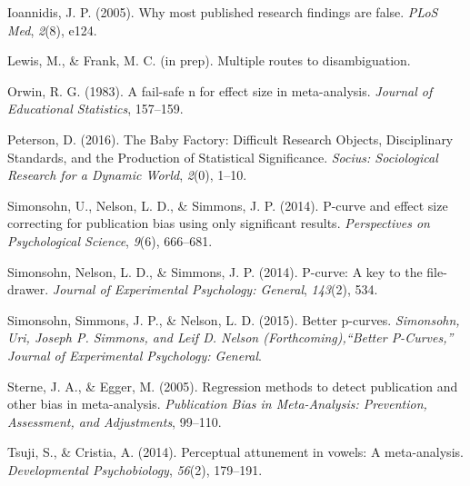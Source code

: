 \documentclass[english,floatsintext,man]{apa6}
\begin{document}
\hypertarget{ref-ioannidis2005most}{}
Ioannidis, J. P. (2005). Why most published research findings are false.
\emph{PLoS Med}, \emph{2}(8), e124.

\hypertarget{ref-lfprep}{}
Lewis, M., \& Frank, M. C. (in prep). Multiple routes to disambiguation.

\hypertarget{ref-orwin1983fail}{}
Orwin, R. G. (1983). A fail-safe n for effect size in meta-analysis.
\emph{Journal of Educational Statistics}, 157--159.

\hypertarget{ref-Peterson:2016}{}
Peterson, D. (2016). The Baby Factory: Difficult Research Objects,
Disciplinary Standards, and the Production of Statistical Significance.
\emph{Socius: Sociological Research for a Dynamic World}, \emph{2}(0),
1--10.

\hypertarget{ref-simonsohn2014power}{}
Simonsohn, U., Nelson, L. D., \& Simmons, J. P. (2014). P-curve and
effect size correcting for publication bias using only significant
results. \emph{Perspectives on Psychological Science}, \emph{9}(6),
666--681.

\hypertarget{ref-simonsohn2014p}{}
Simonsohn, Nelson, L. D., \& Simmons, J. P. (2014). P-curve: A key to
the file-drawer. \emph{Journal of Experimental Psychology: General},
\emph{143}(2), 534.

\hypertarget{ref-simonsohn2015better}{}
Simonsohn, Simmons, J. P., \& Nelson, L. D. (2015). Better p-curves.
\emph{Simonsohn, Uri, Joseph P. Simmons, and Leif D. Nelson
(Forthcoming),``Better P-Curves,'' Journal of Experimental Psychology:
General}.

\hypertarget{ref-sterne2005regression}{}
Sterne, J. A., \& Egger, M. (2005). Regression methods to detect
publication and other bias in meta-analysis. \emph{Publication Bias in
Meta-Analysis: Prevention, Assessment, and Adjustments}, 99--110.

\hypertarget{ref-tsuji2014perceptual}{}
Tsuji, S., \& Cristia, A. (2014). Perceptual attunement in vowels: A
meta-analysis. \emph{Developmental Psychobiology}, \emph{56}(2),
179--191.
\end{document}
